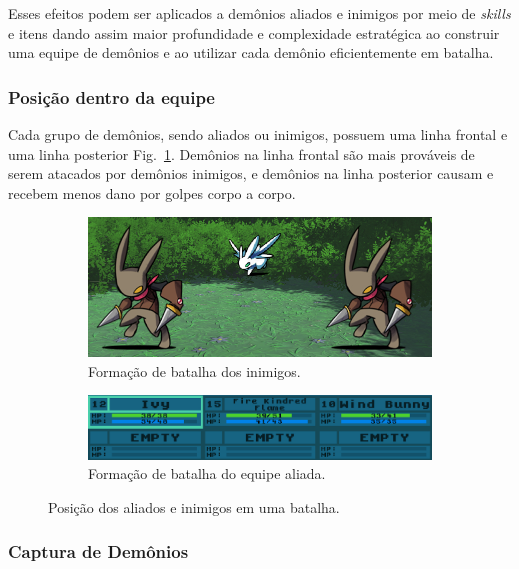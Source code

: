 Esses efeitos podem ser aplicados a demônios aliados e inimigos por meio de \emph{skills} e itens dando assim maior profundidade e complexidade estratégica ao construir uma equipe de demônios e ao utilizar cada demônio eficientemente em batalha. 


\subsubsection{Posição dentro da equipe}\label{info:position}

Cada grupo de demônios, sendo aliados ou inimigos, possuem uma linha frontal e uma linha posterior Fig.~\ref{fig:battle3}. Demônios na linha frontal são mais prováveis  de serem atacados por demônios inimigos, e demônios na linha posterior causam e recebem menos dano por golpes corpo a corpo.

\begin{figure}[h!]
  \centering
  \begin{subfigure}[b]{0.5\linewidth}
    \includegraphics[width=\linewidth]{enemyformation.jpg}
     \caption{Formação de batalha dos inimigos.}
  \end{subfigure}
  \begin{subfigure}[b]{0.5\linewidth}
    \includegraphics[width=\linewidth]{partyformation.jpg}
    \caption{Formação de batalha do equipe aliada.}
  \end{subfigure}
  \caption{Posição dos aliados e inimigos em uma batalha.}
  \label{fig:battle3}
\end{figure}

\subsubsection{Captura de Demônios}

